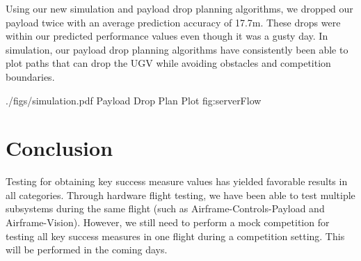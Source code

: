 \documentclass[]{auvsi_doc}
\begin{document}
Using our new simulation and payload drop planning algorithms, we dropped our payload twice with an average
prediction accuracy of 17.7m. These drops were within our predicted performance values even though it was
a gusty day. In simulation, our payload drop planning algorithms have consistently been able to plot paths
that can drop the UGV while avoiding obstacles and competition boundaries.

\AUVSIFigure
{./figs/simulation.pdf}
{\textwidth}
{Payload Drop Plan Plot}
{fig:serverFlow}

\section{Conclusion}

Testing for obtaining key success measure values has yielded favorable results in all categories. Through hardware flight testing, we have been able to test multiple subsystems during the same flight (such as Airframe-Controls-Payload and Airframe-Vision). However, we still need to perform a mock competition for testing all key success measures in one flight during a competition setting. This will be performed in the coming days.
\end{document}
